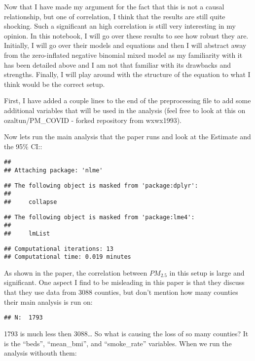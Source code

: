 \documentclass[]{article}
\begin{document}
Now that I have made my argument for the fact that this is not a causal
relationship, but one of correlation, I think that the results are still
quite shocking. Such a significant an high correlation is still very
interesting in my opinion. In this notebook, I will go over these
results to see how robust they are. Initially, I will go over their
models and equations and then I will abstract away from the
zero-inflated negative binomial mixed model as my familiarity with it
has been detailed above and I am not that familiar with its drawbacks
and strengths. Finally, I will play around with the structure of the
equation to what I think would be the correct setup.

First, I have added a couple lines to the end of the preprocessing file
to add some additional variables that will be used in the analysis (feel
free to look at this on ozaltun/PM\_COVID - forked repository from
wxwx1993).

Now lets run the main analysis that the paper runs and look at the
Estimate and the 95\% CI::

\begin{verbatim}
## 
## Attaching package: 'nlme'
\end{verbatim}

\begin{verbatim}
## The following object is masked from 'package:dplyr':
## 
##     collapse
\end{verbatim}

\begin{verbatim}
## The following object is masked from 'package:lme4':
## 
##     lmList
\end{verbatim}

\begin{verbatim}
## Computational iterations: 13 
## Computational time: 0.019 minutes
\end{verbatim}

As shown in the paper, the correlation between \(PM_{2.5}\) in this
setup is large and significant. One aspect I find to be misleading in
this paper is that they discuss that they use data from 3088 counties,
but don't mention how many counties their main analysis is run on:

\begin{verbatim}
## N:  1793
\end{verbatim}

1793 is much less then 3088\ldots{} So what is causing the loss of so
many counties? It is the ``beds'', ``mean\_bmi'', and ``smoke\_rate''
variables. When we run the analysis withouth them:
\end{document}
